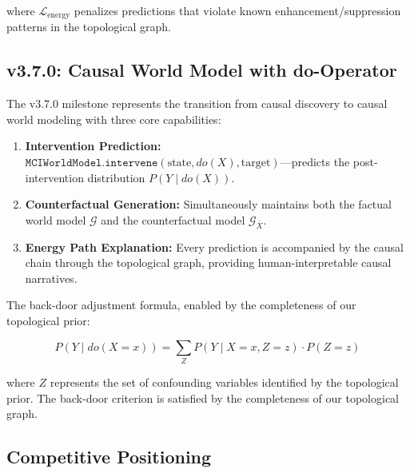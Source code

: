 \documentclass[11pt,a4paper]{article}
\begin{document}
where \(\mathcal{L}_{\text{energy}}\) penalizes predictions that violate known enhancement/suppression patterns in the topological graph.

\subsection{v3.7.0: Causal World Model with do-Operator}

The v3.7.0 milestone represents the transition from causal discovery to causal world modeling with three core capabilities:

\begin{enumerate}[leftmargin=*,itemsep=2pt]
    \item \textbf{Intervention Prediction:} \(\texttt{MCIWorldModel.intervene}(\text{state}, do(X), \text{target})\)---predicts the post-intervention distribution \(P(Y \mid do(X))\).
    \item \textbf{Counterfactual Generation:} Simultaneously maintains both the factual world model \(\mathcal{G}\) and the counterfactual model \(\mathcal{G}_{\overline{X}}\).
    \item \textbf{Energy Path Explanation:} Every prediction is accompanied by the causal chain through the topological graph, providing human-interpretable causal narratives.
\end{enumerate}

The back-door adjustment formula, enabled by the completeness of our topological prior:

\begin{equation}
P(Y \mid do(X = x)) = \sum_{Z} P(Y \mid X = x, Z = z) \cdot P(Z = z)
\label{eq:backdoor}
\end{equation}

where \(Z\) represents the set of confounding variables identified by the topological prior. The back-door criterion is satisfied by the completeness of our topological graph.

\subsection{Competitive Positioning}
\end{document}
